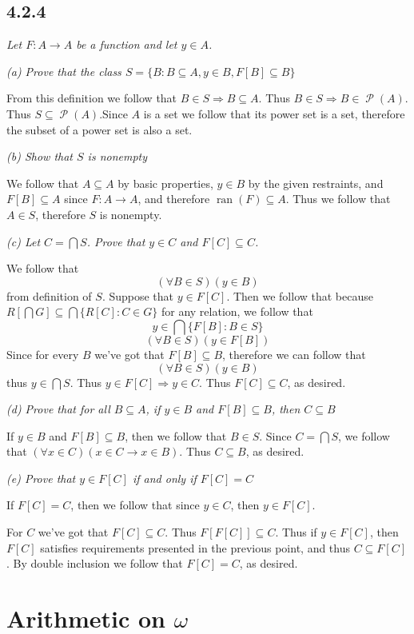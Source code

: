 \documentclass[11pt,oneside,titlepage]{book}
\DeclareMathOperator \pow {\mathcal {P}}
\DeclareMathOperator \ra {\Rightarrow}
\DeclareMathOperator \ran {ran}
\begin{document}
\subsection*{4.2.4}

\textit{Let $F: A \to A$ be a function and let $y \in A$.}

\textit{(a) Prove that the class $S = \{B: B \subseteq A, y \in B, F[B] \subseteq B\}$}

From this definition we follow that $B \in S \ra B \subseteq A$. Thus $B \in S \ra
B \in \pow(A)$. Thus $S \subseteq \pow(A)$.Since $A$ is a set we follow that its power set is a set,
therefore the subset of a power set is also a set.

\textit{(b) Show that $S$ is nonempty}

We follow that $A \subseteq A$ by basic properties, $y \in B$ by the given restraints,
and $F[B] \subseteq A$ since $F: A \to A$, and therefore $\ran(F) \subseteq A$. Thus
we follow that $A \in S$, therefore $S$ is nonempty.

\textit{(c) Let $C = \bigcap S$. Prove that $y \in C$ and $F[C] \subseteq C$.}

We follow that
$$(\forall B \in S)(y \in B)$$
from definition of $S$. Suppose that $y \in F[C]$. Then we follow that
because $R[\bigcap G] \subseteq \bigcap\{R[C]: C \in G\}$ for any relation, we follow that
$$y \in \bigcap\{F[B]: B \in S\}$$
$$(\forall B \in S)(y \in F[B])$$
Since for every $B$ we've got that $F[B] \subseteq B$, therefore we can follow that
$$(\forall B \in S)(y \in B)$$
thus $y \in \bigcap S$. Thus $y \in F[C] \ra y \in C$. Thus $F[C] \subseteq C$, as desired.

\textit{(d) Prove that for all $B \subseteq A$, if $y \in B$ and $F[B] \subseteq B$, then
  $C \subseteq B$}

If $y \in B$ and $F[B] \subseteq B$, then we follow that $B \in S$. Since $C = \bigcap S$,
we follow that $(\forall x \in C) (x \in C \to x \in B)$. Thus $C \subseteq B$, as desired.

\textit{(e) Prove that $y \in F[C]$ if and only if $F[C] = C$}

If $F[C] = C$, then we follow that since $y \in C$, then $y \in F[C]$.

For $C$ we've got that $F[C] \subseteq C$. Thus $F[F[C]] \subseteq C$. Thus if $y \in F[C]$, then
$F[C]$ satisfies requirements presented in the previous point, and thus $C \subseteq F[C]$.
By double inclusion we follow that $F[C] = C$, as desired.

\section{Arithmetic on $\omega$}
\end{document}
